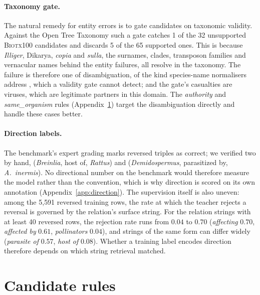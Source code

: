 \documentclass[11pt]{article}
\begin{document}
\paragraph{Taxonomy gate.}
The natural remedy for entity errors is to gate candidates on taxonomic validity. Against the Open
Tree Taxonomy \citep{rees2017opentree} such a gate catches 1 of the 32 unsupported \textsc{Biotx100}
candidates and discards 5 of the 65 supported ones. This is because \emph{Illiger},
Dikarya, \emph{copia} and \emph{sulla}, the surnames, clades, transposon families and vernacular
names behind the entity failures, all resolve in the taxonomy. The failure is therefore one of disambiguation, of the kind species-name normalisers address \citep{gerner2010linnaeus}, which a validity gate cannot detect; and the gate's casualties are viruses, which are legitimate partners in this domain. The
\emph{authority} and \emph{same\_organism} rules (Appendix~\ref{app:rules}) target the disambiguation
directly and handle these cases better.

\paragraph{Direction labels.}
The benchmark's expert grading marks reversed triples as correct; we verified two by hand,
(\emph{Breinlia}, host of, \emph{Rattus}) and (\emph{Demidospermus}, parasitized by,
\emph{A.\ inermis}). No directional number on the benchmark would therefore measure the model rather
than the convention, which is why direction is scored on its own annotation
(Appendix~\ref{app:direction}). The supervision itself is also uneven: among the
5{,}591 reversed training rows, the rate at which the teacher rejects a reversal is governed by the
relation's surface string. For the relation strings with at least 40 reversed rows, the rejection
rate runs from $0.04$ to $0.70$ (\emph{affecting} $0.70$, \emph{affected by} $0.61$, \emph{pollinators}
$0.04$), and strings of the same form can differ widely (\emph{parasite of} $0.57$, \emph{host of}
$0.08$). Whether a training label encodes direction therefore depends on which string retrieval matched.

\section{Candidate rules}
\label{app:rules}
\end{document}
